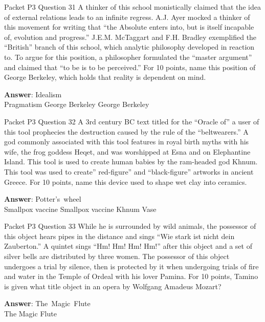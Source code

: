 \begin{frame}{Packet P3 Question 31}
A thinker of this school monistically claimed that the idea of external relations leads to an infinite regress. A.J. Ayer mocked a thinker of this movement for writing that “the Absolute   enters into, but is itself incapable of, evolution and progress.” J.E.M. McTaggart and F.H. Bradley exemplified the “British” branch of this school, which analytic philosophy developed in reaction to. To argue for this position, a philosopher formulated the “master argument” and claimed that “to be is to be perceived.” For 10 points, name this position of George Berkeley,   which holds that reality is dependent on mind.    

\textbf{Answer}: Idealism\\
 Pragmatism
 George Berkeley
 George Berkeley
\end{frame}

\begin{frame}{Packet P3 Question 32}
A 3rd century BC text titled for the “Oracle of” a user of this tool prophecies the   destruction caused by the rule of the “beltwearers.” A god commonly associated with this tool features   in royal birth myths with his wife, the frog goddess Heqet, and was worshipped at Esna and on Elephantine Island. This   tool is used to create human babies by the ram-headed god Khnum. This tool was used to create” red-figure” and “black-figure” artworks in ancient Greece. For 10 points, name this device used to shape wet clay into ceramics.  

\textbf{Answer}: Potter's\ wheel\\
 Smallpox vaccine
 Smallpox vaccine
 Khnum
 Vase
\end{frame}

\begin{frame}{Packet P3 Question 33}
While he is surrounded by wild animals, the possessor of this object hears pipes in the distance and sings ``Wie stark ist nicht dein Zauberton.'' A quintet sings ``Hm! Hm! Hm! Hm!'' after   this object and a set of silver bells are distributed by three women. The possessor of this object undergoes a trial   by silence, then is protected by it when undergoing trials of fire and water in the Temple of Ordeal with his lover Pamina.   For 10 points, Tamino is given what title object in an opera by Wolfgang Amadeus Mozart?  

\textbf{Answer}: The\ Magic\ Flute\\
 The Magic Flute
\end{frame}

